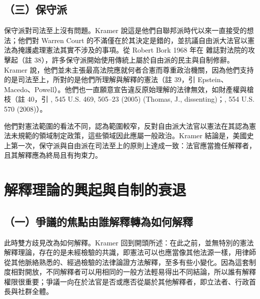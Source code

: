\subsection{（三）保守派}

保守派對司法至上沒有問題。Kramer 說這是他們自聯邦派時代以來一直接受的想法；他們對 Warren Court 的不滿僅在於其決定是錯的，並抗議自由派大法官以憲法為掩護處理憲法其實不涉及的事項。從 Robert Bork 1968 年在  雜誌對法院的攻擊起（註 38），許多保守派開始使用傳統上屬於自由派的民主與自制修辭。Kramer 說，他們並未主張最高法院應就何者合憲而尊重政治機關，因為他們支持的是司法至上，所對的是他們所理解與解釋的憲法（註 39，引 Epstein、Macedo、Powell）。他們也一直願意宣告違反原始理解的法律無效，如財產權與槍枝（註 40，引 , 545 U.S. 469, 505--23 (2005) (Thomas, J., dissenting)；, 554 U.S. 570 (2008)）。

他們對憲法範圍的看法不同，認為範圍較窄，反對自由派大法官以憲法在其認為憲法未規範的領域制定政策，這些領域因此應屬一般政治。Kramer 結論是，美國史上第一次，保守派與自由派在司法至上的原則上達成一致：法官應當擔任解釋者，且其解釋應為終局且有拘束力。

\section{解釋理論的興起與自制的衰退}
\label{sec:Kramer-6}

\subsection{（一）爭議的焦點由誰解釋轉為如何解釋}

此時雙方歧見改為如何解釋。Kramer 回到開頭所述：在此之前，並無特別的憲法解釋理論，存在的是未經檢驗的共識，即憲法可以也應當像其他法源一樣，用律師從其他脈絡熟悉的、經過檢驗的法律論證方法解釋，至多有些小變化。因為這套制度相對開放，不同解釋者可以用相同的一般方法輕易得出不同結論，所以誰有解釋權限很重要；爭議一向在於法官是否或應否從屬於其他解釋者，即立法者、行政首長與社群全體。


